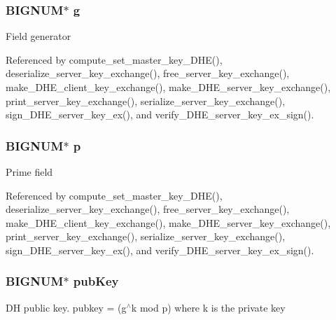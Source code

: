 \subsubsection[{\texorpdfstring{g}{g}}]{\setlength{\rightskip}{0pt plus 5cm}B\+I\+G\+N\+UM$\ast$ g}\hypertarget{structdhe__server__key__exchange__t_ada27d9fb07daaac14be19b4ce12a7400}{}\label{structdhe__server__key__exchange__t_ada27d9fb07daaac14be19b4ce12a7400}
Field generator 

Referenced by compute\+\_\+set\+\_\+master\+\_\+key\+\_\+\+D\+H\+E(), deserialize\+\_\+server\+\_\+key\+\_\+exchange(), free\+\_\+server\+\_\+key\+\_\+exchange(), make\+\_\+\+D\+H\+E\+\_\+client\+\_\+key\+\_\+exchange(), make\+\_\+\+D\+H\+E\+\_\+server\+\_\+key\+\_\+exchange(), print\+\_\+server\+\_\+key\+\_\+exchange(), serialize\+\_\+server\+\_\+key\+\_\+exchange(), sign\+\_\+\+D\+H\+E\+\_\+server\+\_\+key\+\_\+ex(), and verify\+\_\+\+D\+H\+E\+\_\+server\+\_\+key\+\_\+ex\+\_\+sign().

\subsubsection[{\texorpdfstring{p}{p}}]{\setlength{\rightskip}{0pt plus 5cm}B\+I\+G\+N\+UM$\ast$ p}\hypertarget{structdhe__server__key__exchange__t_a4ed2e531b9fd8a6ca6ad6804565299a7}{}\label{structdhe__server__key__exchange__t_a4ed2e531b9fd8a6ca6ad6804565299a7}
Prime field 

Referenced by compute\+\_\+set\+\_\+master\+\_\+key\+\_\+\+D\+H\+E(), deserialize\+\_\+server\+\_\+key\+\_\+exchange(), free\+\_\+server\+\_\+key\+\_\+exchange(), make\+\_\+\+D\+H\+E\+\_\+client\+\_\+key\+\_\+exchange(), make\+\_\+\+D\+H\+E\+\_\+server\+\_\+key\+\_\+exchange(), print\+\_\+server\+\_\+key\+\_\+exchange(), serialize\+\_\+server\+\_\+key\+\_\+exchange(), sign\+\_\+\+D\+H\+E\+\_\+server\+\_\+key\+\_\+ex(), and verify\+\_\+\+D\+H\+E\+\_\+server\+\_\+key\+\_\+ex\+\_\+sign().

\subsubsection[{\texorpdfstring{pub\+Key}{pubKey}}]{\setlength{\rightskip}{0pt plus 5cm}B\+I\+G\+N\+UM$\ast$ pub\+Key}\hypertarget{structdhe__server__key__exchange__t_a1aca399a862132922f9cabef045d11e3}{}\label{structdhe__server__key__exchange__t_a1aca399a862132922f9cabef045d11e3}
DH public key. pubkey = (g$^\wedge$k mod p) where k is the private key 

